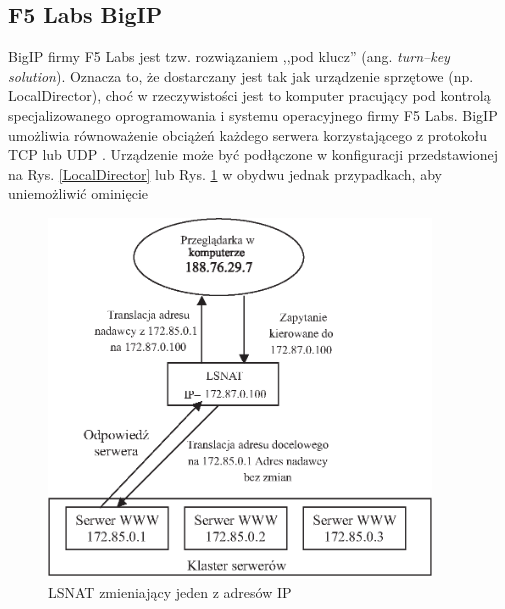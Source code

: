 \subsection{F5 Labs BigIP}

BigIP firmy F5 Labs jest tzw. rozwiązaniem ,,pod klucz'' (ang. \emph{turn--key solution}). Oznacza to, że dostarczany 
jest tak jak urządzenie sprzętowe (np. LocalDirector), choć w rzeczywistości jest to komputer pracujący pod 
kontrolą specjalizowanego oprogramowania i systemu operacyjnego firmy F5 Labs. BigIP umożliwia równoważenie 
obciążeń każdego serwera korzystającego z protokołu TCP lub UDP \cite{barylo32,barylo33}. Urządzenie może być podłączone w 
konfiguracji przedstawionej na Rys. \ref{LocalDirector} lub Rys. \ref{LocalDirector1} w obydwu jednak przypadkach, aby uniemożliwić ominięcie 
\begin{figure}[h]
\centering
\includegraphics[width=4in]{./rysunki/LocalDirector1.eps}
\caption{LSNAT zmieniający jeden z adresów IP}
\label{LocalDirector1}
\end{figure}

